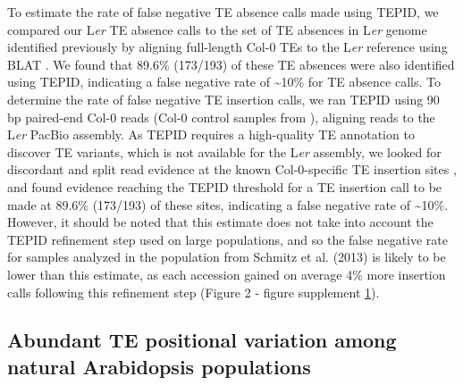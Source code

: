 \documentclass[12pt]{article}
\begin{document}
To estimate the rate of false negative TE absence calls made using
TEPID, we compared our L\emph{er} TE absence calls to the set of TE
absences in L\emph{er} genome identified previously by aligning
full-length Col-0 TEs to the L\emph{er} reference using BLAT
\cite{Quadrana:2016bi}. We found that 89.6\% (173/193) of these TE
absences were also identified using TEPID, indicating a false negative
rate of \textasciitilde{}10\% for TE absence calls. To determine the
rate of false negative TE insertion calls, we ran TEPID using 90 bp
paired-end Col-0 reads (Col-0 control samples from \cite{Jiang:2014ih}),
aligning reads to the L\emph{er }PacBio assembly. As TEPID requires a
high-quality TE annotation to discover TE variants, which is not
available for the L\emph{er }assembly, we looked for discordant and
split read evidence at the known Col-0-specific TE insertion sites
\cite{Quadrana:2016bi}, and found evidence reaching the TEPID threshold
for a TE insertion call to be made at 89.6\% (173/193) of these sites,
indicating a false negative rate of \textasciitilde{}10\%. However, it
should be noted that this estimate does not take into account the TEPID
refinement step used on large populations, and so the false negative
rate for samples analyzed in the population from Schmitz et al. (2013)
is likely to be lower than this estimate, as each accession gained on
average 4\% more insertion calls following this refinement step (Figure
2 - figure supplement \hyperref[fig2s1]{1}).

\subsection{Abundant TE positional variation among natural Arabidopsis
populations}
\end{document}
